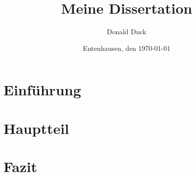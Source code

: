 \documentclass[12pt,ngerman]{scrreprt}
\author{Donald Duck}
\title{Meine Dissertation}
\date{Entenhausen, den \today}
\begin{document}
\maketitle

\tableofcontents

\chapter{Einführung}

\blindtext[200]

\blindtext[200]

\blindtext[200]


\chapter{Hauptteil}

\blindtext[200]

\blindtext[200]

\blindtext[200]


\chapter{Fazit}

\blindtext[200]

\blindtext[200]

\blindtext[200]
\end{document}
